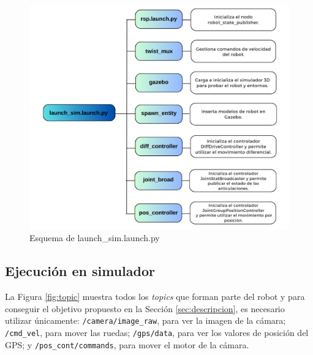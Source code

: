  \begin{figure} [h!]
	\begin{center}
		\includegraphics[width=14cm]{figs/cap6/diagram.png}
	\end{center}
	\caption{Esquema de launch\_sim.launch.py}
	\label{fig:launcherdiagram}
\end{figure}


\subsection{Ejecución en simulador}
\label{subsec:funsimulacion}


La Figura \ref{fig:topic} muestra todos los \textit{topics} que forman parte del robot y para conseguir el objetivo propuesto en la Sección \ref{sec:descripcion}, es necesario utilizar únicamente: \verb|/camera/image_raw|, para ver la imagen de la cámara; \verb|/cmd_vel|, para mover las ruedas; \verb|/gps/data|, para ver los valores de posición del \acs{GPS}; y \verb|/pos_cont/commands|, para mover el motor de la cámara.

